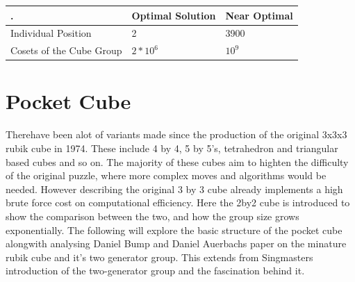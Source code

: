 \documentclass{article}
\newcounter{lem}[section]\setcounter{lem}{0}
\begin{document}
\begin{center}
\label{:thistletab}
    \begin{tabular}{ |p{5cm}| p{4cm}| p{4cm}|}
    \hline
    . & Optimal Solution & Near Optimal \\ \hline
    Individual Position & 2 & 3900\\ \hline
	Cosets of the Cube Group & $2*10^6$  & $10^9$\\ \hline
    \end{tabular}
\end{center}
\newpage
\section{Pocket Cube}

\begin{figure}[h]
\centering
  \TwoCubeSolved%
\end{figure}

Therehave been alot of variants made since the production of the original 3x3x3 rubik cube in 1974. These include 4 by 4, 5 by 5's, tetrahedron and triangular based cubes and so on. The majority of these cubes aim to highten the difficulty of the original puzzle, where more complex moves and algorithms would be needed. However describing the original 3 by 3 cube already implements a high brute force cost on computational efficiency. Here the 2by2 cube is introduced to show the comparison between the two, and how the group size grows exponentially. The following will explore the basic structure of the pocket cube alongwith analysing Daniel Bump and Daniel Auerbachs paper on the minature rubik cube and it's two generator group. This extends from Singmasters introduction of the two-generator group and the fascination behind it.
\end{document}
